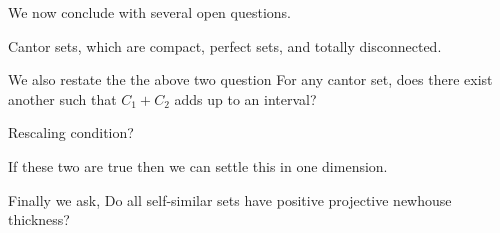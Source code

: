 We now conclude with several open questions.
\begin{conjecture}
    Cantor sets, which are compact, perfect sets, and totally disconnected.     
\end{conjecture}

We also restate the the above two question
For any cantor set, does there exist another such that $C_1 + C_2$ adds up to an interval?

Rescaling condition?

If these two are true then we can settle this in one dimension.  

Finally we ask, 
Do all self-similar sets have positive projective newhouse thickness?


%



